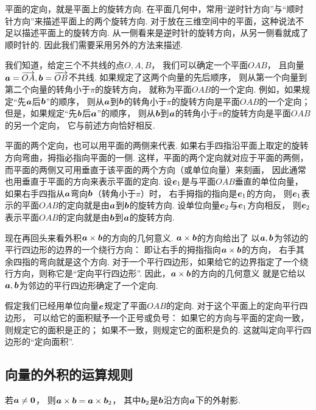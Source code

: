 平面的定向，就是平面上的旋转方向.
在平面几何中，常用“逆时针方向”与“顺时针方向”来描述平面上的两个旋转方向.
对于放在三维空间中的平面，这种说法不足以描述平面上的旋转方向.
从一侧看来是逆时针的旋转方向，从另一侧看就成了顺时针的.
因此我们需要采用另外的方法来描述.

我们知道，给定三个不共线的点\(O,A,B\)，
我们可以确定一个平面\(OAB\)，
且向量\(\boldsymbol{a}=\overrightarrow{OA},
\boldsymbol{b}=\overrightarrow{OB}\)不共线.
如果规定了这两个向量的先后顺序，
则从第一个向量到第二个向量的转角小于\(\pi\)的旋转方向，
就称为平面\(OAB\)的一个定向.
例如，如果规定“先\(\boldsymbol{a}\)后\(\boldsymbol{b}\)”的顺序，
则从\(\boldsymbol{a}\)到\(\boldsymbol{b}\)的转角小于\(\pi\)的旋转方向是平面\(OAB\)的一个定向；
但是，如果规定“先\(\boldsymbol{b}\)后\(\boldsymbol{a}\)”的顺序，
则从\(\boldsymbol{b}\)到\(\boldsymbol{a}\)的转角小于\(\pi\)的旋转方向是平面\(OAB\)的另一个定向，
它与前述方向恰好相反.

平面的两个定向，也可以用平面的两侧来代表.
如果右手四指沿平面上取定的旋转方向弯曲，拇指必指向平面的一侧.
这样，平面的两个定向就对应于平面的两侧，
而平面的两侧又可用垂直于该平面的两个方向（或单位向量）来刻画，
因此通常也用垂直于平面的方向来表示平面的定向.
设\(\boldsymbol{e}_1\)是与平面\(OAB\)垂直的单位向量，
如果右手四指从\(\boldsymbol{a}\)弯向\(\boldsymbol{b}\)（转角小于\(\pi\)）时，
右手拇指的指向是\(\boldsymbol{e}_1\)的方向，
则\(\boldsymbol{e}_1\)表示的平面\(OAB\)的定向就是由\(\boldsymbol{a}\)到\(\boldsymbol{b}\)的旋转方向.
设单位向量\(\boldsymbol{e}_2\)与\(\boldsymbol{e}_1\)方向相反，
则\(\boldsymbol{e}_2\)表示平面\(OAB\)的定向就是由\(\boldsymbol{b}\)到\(\boldsymbol{a}\)的旋转方向.

现在再回头来看外积\(\boldsymbol{a}\times\boldsymbol{b}\)的方向的几何意义.
\(\boldsymbol{a}\times\boldsymbol{b}\)的方向给出了
以\(\boldsymbol{a},\boldsymbol{b}\)为邻边的平行四边形的边界的一个绕行方向：
即让右手的拇指指向\(\boldsymbol{a}\times\boldsymbol{b}\)的方向，
右手其余四指的弯向就是这个方向.
对于一个平行四边形，如果给它的边界指定了一个绕行方向，则称它是“定向平行四边形”.
因此，\(\boldsymbol{a}\times\boldsymbol{b}\)的方向的几何意义
就是它给以\(\boldsymbol{a},\boldsymbol{b}\)为邻边的平行四边形确定了一个定向.

假定我们已经用单位向量\(\boldsymbol{e}\)规定了平面\(OAB\)的定向.
对于这个平面上的定向平行四边形，
可以给它的面积赋予一个正号或负号：
如果它的方向与平面的定向一致，则规定它的面积是正的；
如果不一致，则规定它的面积是负的.
这就叫定向平行四边形的“定向面积”.

\subsection{向量的外积的运算规则}
\begin{theorem}
若\(\boldsymbol{a}\neq\boldsymbol{0}\)，
则\(\boldsymbol{a}\times\boldsymbol{b}=\boldsymbol{a}\times\boldsymbol{b}_2\)，
其中\(\boldsymbol{b}_2\)是\(\boldsymbol{b}\)沿方向\(\boldsymbol{a}\)下的外射影.
\end{theorem}

